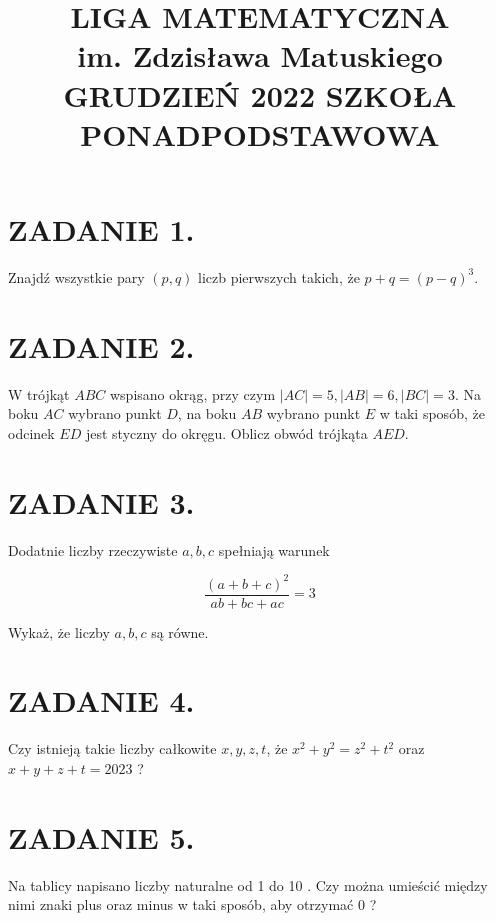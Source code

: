 \documentclass[10pt]{article}
\title{LIGA MATEMATYCZNA \\
 im. Zdzisława Matuskiego GRUDZIEŃ 2022 SZKOŁA PONADPODSTAWOWA }
\author{}
\date{}
\begin{document}
\maketitle
\section*{ZADANIE 1.}
Znajdź wszystkie pary \((p, q)\) liczb pierwszych takich, że \(p+q=(p-q)^{3}\).

\section*{ZADANIE 2.}
W trójkąt \(A B C\) wspisano okrąg, przy czym \(|A C|=5,|A B|=6,|B C|=3\). Na boku \(A C\) wybrano punkt \(D\), na boku \(A B\) wybrano punkt \(E\) w taki sposób, że odcinek \(E D\) jest styczny do okręgu. Oblicz obwód trójkąta \(A E D\).

\section*{ZADANIE 3.}
Dodatnie liczby rzeczywiste \(a, b, c\) spełniają warunek

\[
\frac{(a+b+c)^{2}}{a b+b c+a c}=3
\]

Wykaż, że liczby \(a, b, c\) są równe.

\section*{ZADANIE 4.}
Czy istnieją takie liczby całkowite \(x, y, z, t\), że \(x^{2}+y^{2}=z^{2}+t^{2}\) oraz \(x+y+z+t=2023\) ?

\section*{ZADANIE 5.}
Na tablicy napisano liczby naturalne od 1 do 10 . Czy można umieścić między nimi znaki plus oraz minus w taki sposób, aby otrzymać 0 ?
\end{document}
